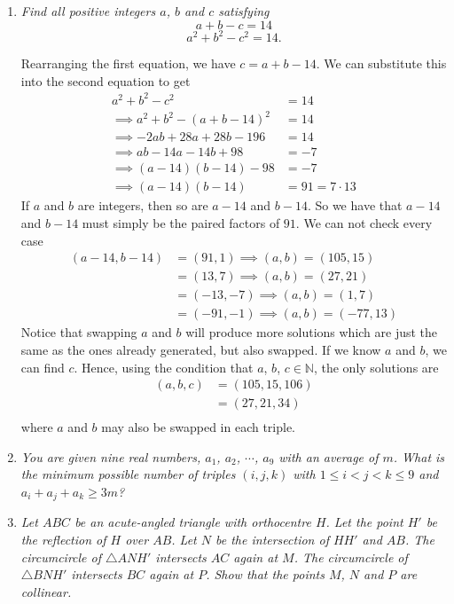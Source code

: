 \documentclass{article}
\begin{document}
\begin{enumerate}[1.]
\item %
{\itshape Find all positive integers $a$, $b$ and $c$ satisfying 
$$a + b - c = 14$$
$$a^2 + b^2 - c^2 = 14.$$}

Rearranging the first equation, we have $c = a + b - 14$. We can substitute this into the second equation to get 
\begin{align*}
  a^2 + b^2 - c^2 &= 14 \\
  \implies a^2 + b^2 - (a + b - 14)^2 &= 14 \\
  \implies -2ab + 28a + 28b - 196 &= 14 \\
  \implies ab - 14a - 14 b + 98 &= -7 \\
  \implies (a - 14)(b - 14) - 98 &= -7 \\
  \implies (a - 14)(b - 14) &= 91 = 7 \cdot 13
\end{align*}
If $a$ and $b$ are integers, then so are $a - 14$ and $b - 14$. So we have that $a - 14$ and $b - 14$ must simply be the paired factors of $91$. We can not check every case 
\begin{align*}
  (a - 14, b - 14) &= (91, 1) \implies (a, b) = (105, 15) \\
  &= (13, 7) \implies (a, b) = (27, 21) \\
  &= (-13, -7) \implies (a, b) = (1, 7) \\
  &= (-91, -1) \implies (a, b) = (-77, 13)
\end{align*}
Notice that swapping $a$ and $b$ will produce more solutions which are just the same as the ones already generated, but also swapped. If we know $a$ and $b$, we can find $c$. Hence, using the condition that $a$, $b$, $c \in \mathbb{N}$, the only solutions are
\begin{align*}
  (a, b, c) &= (105, 15, 106) \\
  &= (27, 21, 34) \\
\end{align*}
where $a$ and $b$ may also be swapped in each triple.

\item %
{\itshape You are given nine real numbers, $a_1$, $a_2$, $\cdots$, $a_9$ with an average of $m$. What is the minimum possible number of triples $(i, j, k)$ with $1 \le i < j < k \le 9$ and $a_i + a_j + a_k \ge 3m$?}


\item %
{\itshape Let $ABC$ be an acute-angled triangle with orthocentre $H$. Let the point $H'$ be the reflection of $H$ over $AB$. Let $N$ be the intersection of $HH'$ and $AB$. The circumcircle of $\triangle ANH'$ intersects $AC$ again at $M$. The circumcircle of $\triangle BNH'$ intersects $BC$ again at $P$. Show that the points $M$, $N$ and $P$ are collinear.}


\end{enumerate}
\end{document}
